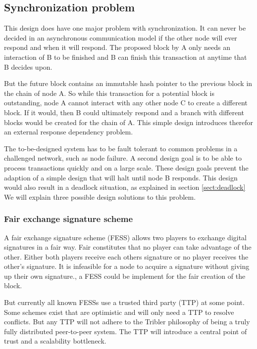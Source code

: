 \subsection{Synchronization problem}
This design does have one major problem with synchronization.
It can never be decided in an asynchronous communication model
if the other node will ever respond and when it will respond.
The proposed block by A only needs an interaction of B to be finished
and B can finish this transaction at anytime that B decides upon.

But the future block contains an immutable hash pointer
to the previous block in the chain of node A.
So while this transaction for a potential block is outstanding,
node A cannot interact with any other node C to create a different block.
If it would, then B could ultimately respond and a branch with different blocks
would be created for the chain of A.
This simple design introduces therefor an external response dependency problem.

The to-be-designed system has to be fault tolerant to
common problems in a challenged network, such as node failure.
A second design goal is to be able to process transactions quickly and on a large scale.
These design goals prevent the adaption of a simple design that will halt until node B responds.
This design would also result in a deadlock situation, as explained in section \ref{sect:deadlock}
We will explain three possible design solutions to this problem.

\subsubsection{Fair exchange signature scheme}
A fair exchange signature scheme (FESS) allows two players to exchange digital signatures in a fair way.
Fair constitutes that no player can take advantage of the other.
Either both players receive each others signature or no player receives the other's signature.
It is infeasible for a node to acquire a signature without giving up their own signature.\cite{asokan-fairexchange},
a FESS could be implement for the fair creation of the block.

But currently all known FESSs use a trusted third party (TTP) at some point\cite{asokan-fairexchange}.
Some schemes exist that are optimistic and will only need a TTP to resolve conflicts.
But any TTP will not adhere to the Tribler philosophy
of being a truly fully distributed peer-to-peer system.
The TTP will introduce a central point of trust and a scalability bottleneck.

